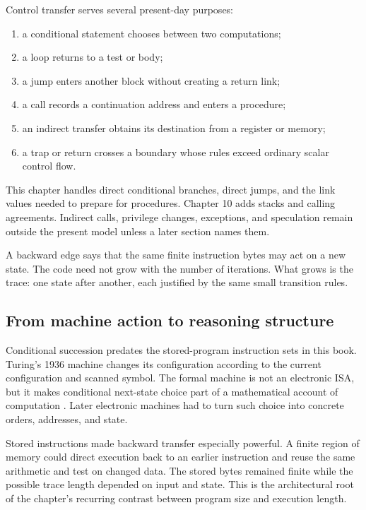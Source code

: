 Control transfer serves several present-day purposes:

\begin{enumerate}
\item a conditional statement chooses between two computations;
\item a loop returns to a test or body;
\item a jump enters another block without creating a return link;
\item a call records a continuation address and enters a procedure;
\item an indirect transfer obtains its destination from a register or memory;
\item a trap or return crosses a boundary whose rules exceed ordinary scalar
control flow.
\end{enumerate}

This chapter handles direct conditional branches, direct jumps, and the link
values needed to prepare for procedures. Chapter 10 adds stacks and calling
agreements. Indirect calls, privilege changes, exceptions, and speculation
remain outside the present model unless a later section names them.

\begin{archive}[title={A loop compresses time into an address}]
A backward edge says that the same finite instruction bytes may act on a new
state. The code need not grow with the number of iterations. What grows is the
trace: one state after another, each justified by the same small transition
rules.
\end{archive}

\subsection{From machine action to reasoning structure}

Conditional succession predates the stored-program instruction sets in this
book. Turing's 1936 machine changes its configuration according to the current
configuration and scanned symbol. The formal machine is not an electronic ISA,
but it makes conditional next-state choice part of a mathematical account of
computation \autocite{turing1936computable}. Later electronic machines had to
turn such choice into concrete orders, addresses, and state.

Stored instructions made backward transfer especially powerful. A finite
region of memory could direct execution back to an earlier instruction and
reuse the same arithmetic and test on changed data. The stored bytes remained
finite while the possible trace length depended on input and state. This is
the architectural root of the chapter's recurring contrast between program
size and execution length.

